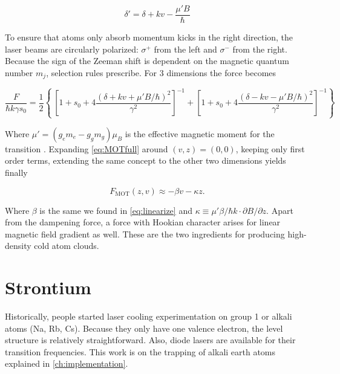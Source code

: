\begin{equation}\label{eq:DetuningFull}
	\delta' = \delta + k v - \frac{\mu'B}{\hbar}
\end{equation}

To ensure that atoms only absorb momentum kicks in the right direction, the laser beams are circularly polarized: $\sigma^+$ from the left and $\sigma^-$ from the right. Because the sign of the Zeeman shift is dependent on the magnetic quantum number $m_j$, selection rules prescribe. For 3 dimensions the force becomes

\begin{equation}\label{eq:MOTfull}
	\frac{F}{\hbar k \gamma s_0} = \frac{1}{2}\left\{\
	\left[1 + s_0 + 4\frac{(\delta+kv+\mu'B/\hbar)^2}{\gamma^2}\right]^{-1}+
	\left[1 + s_0 + 4\frac{(\delta-kv-\mu'B/\hbar)^2}{\gamma^2}\right]^{-1}
	\right\}
\end{equation}

Where $\mu' = (g_e m_e-g_g m_g)\mu_B$ is the effective magnetic moment for the transition \cite{Kowalski2010}. Expanding \cref{eq:MOTfull} around $(v,z) = (0,0)$, keeping only first order terms, extending the same concept to the other two dimensions yields finally

\begin{equation}\label{eq:ForceMOT}
	F_{\text{MOT}}(z,v) \approx -\beta v - \kappa z.
\end{equation}

Where $\beta$ is the same we found in \cref{eq:linearize} and $\kappa \equiv \mu' \beta /\hbar k \cdot \partial B/\partial z$. Apart from the dampening force, a force with Hookian character arises for linear magnetic field gradient as well. These are the two ingredients for producing high-density cold atom clouds. 



\section{Strontium}\label{sec:Sr}

Historically, people started laser cooling experimentation on group 1 or alkali atoms (Na, Rb, Cs). Because they only have one valence electron, the level structure is relatively straightforward. Also, diode lasers are available for their transition frequencies. This work is on the trapping of alkali earth atoms explained in \cref{ch:implementation}.

